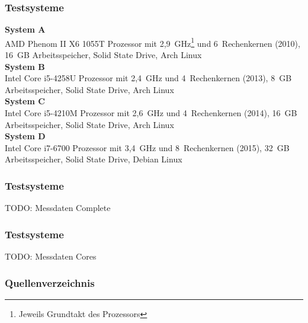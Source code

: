     \begin{frame}[noframenumbering]
      \frametitle{Testsysteme}
      {
        \footnotesize
        \textbf{System A}\\
          AMD Phenom II X6 1055T Prozessor mit 2,9~GHz\footnote{Jeweils Grundtakt des Prozessors} und 6~Rechenkernen (2010), 16~GB Arbeitsspeicher, Solid State Drive, Arch Linux\\[1em]
        \textbf{System B}\\
          Intel Core i5-4258U Prozessor mit 2,4~GHz und 4~Rechenkernen (2013), 8~GB Arbeitsspeicher, Solid State Drive, Arch Linux\\[1em]
        \textbf{System C}\\
          Intel Core i5-4210M Prozessor mit 2,6~GHz und 4~Rechenkernen (2014), 16~GB Arbeitsspeicher, Solid State Drive, Arch Linux\\[1em]
        \textbf{System D}\\
          Intel Core i7-6700 Prozessor mit 3,4~GHz und 8~Rechenkernen (2015), 32~GB Arbeitsspeicher, Solid State Drive, Debian Linux
      }
    \end{frame}

    \begin{frame}[noframenumbering]
      \frametitle{Testsysteme}
      TODO: Messdaten Complete
    \end{frame}

    \begin{frame}[noframenumbering]
      \frametitle{Testsysteme}
      TODO: Messdaten Cores
    \end{frame}

    \begin{frame}
      \frametitle{Quellenverzeichnis}
      \printbibliography
    \end{frame}

